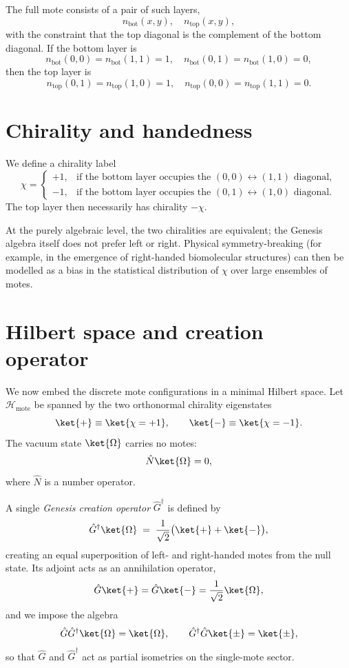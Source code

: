 The full mote consists of a pair of such layers,
\[
  n_{\mathrm{bot}}(x,y),\quad
  n_{\mathrm{top}}(x,y),
\]
with the constraint that the top diagonal is the complement of the
bottom diagonal.  If the bottom layer is
\[
  n_{\mathrm{bot}}(0,0) = n_{\mathrm{bot}}(1,1) = 1,\quad
  n_{\mathrm{bot}}(0,1) = n_{\mathrm{bot}}(1,0) = 0,
\]
then the top layer is
\[
  n_{\mathrm{top}}(0,1) = n_{\mathrm{top}}(1,0) = 1,\quad
  n_{\mathrm{top}}(0,0) = n_{\mathrm{top}}(1,1) = 0.
\]

\section{Chirality and handedness}

We define a chirality label
\begin{equation}
  \chi = 
  \begin{cases}
    +1, & \text{if the bottom layer occupies the $(0,0)\!\leftrightarrow\!(1,1)$ diagonal},\\[4pt]
    -1, & \text{if the bottom layer occupies the $(0,1)\!\leftrightarrow\!(1,0)$ diagonal}.
  \end{cases}
  \label{eq:mote-chirality}
\end{equation}
The top layer then necessarily has chirality $-\chi$.

At the purely algebraic level, the two chiralities are equivalent; the
Genesis algebra itself does not prefer left or right.  Physical
symmetry-breaking (for example, in the emergence of right-handed
biomolecular structures) can then be modelled as a bias in the
statistical distribution of $\chi$ over large ensembles of motes.

\section{Hilbert space and creation operator}

We now embed the discrete mote configurations in a minimal Hilbert
space.  Let $\mathcal{H}_{\mathrm{mote}}$ be spanned by the two
orthonormal chirality eigenstates
\[
  \ket{+} \equiv \ket{\chi=+1},\qquad
  \ket{-} \equiv \ket{\chi=-1}.
\]
The vacuum state $\ket{\Omega}$ carries no motes:
\[
  \hat{N} \ket{\Omega} = 0,
\]
where $\hat{N}$ is a number operator.

A single \emph{Genesis creation operator} $\hat{G}^\dagger$ is defined by
\begin{equation}
  \hat{G}^\dagger \ket{\Omega}
   \;=\;
   \frac{1}{\sqrt{2}}\bigl(\ket{+} + \ket{-}\bigr),
  \label{eq:genesis-creation}
\end{equation}
creating an equal superposition of left- and right-handed motes from
the null state.  Its adjoint acts as an annihilation operator,
\[
  \hat{G}\ket{+} = \hat{G}\ket{-} = \frac{1}{\sqrt{2}} \ket{\Omega},
\]
and we impose the algebra
\begin{equation}
  \hat{G}\hat{G}^\dagger \ket{\Omega} = \ket{\Omega},\qquad
  \hat{G}^\dagger \hat{G} \ket{\pm} = \ket{\pm},
  \label{eq:genesis-algebra}
\end{equation}
so that $\hat{G}$ and $\hat{G}^\dagger$ act as partial isometries on
the single-mote sector.

